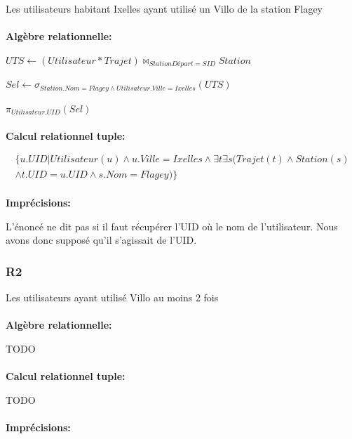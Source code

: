 \documentclass[a4paper, 12pt]{report}
\begin{document}
Les utilisateurs habitant Ixelles ayant utilisé un Villo de la station Flagey
\paragraph{}
\textbf{Algèbre relationnelle:}

$UTS\leftarrow (Utilisateur * Trajet)\bowtie_{StationDépart=SID} Station$

$Sel\leftarrow \sigma_{Station.Nom=Flagey\wedge Utilisateur.Ville=Ixelles}(UTS)$

$\pi_{Utilisateur.UID}(Sel)$
\paragraph{}
\textbf{Calcul relationnel tuple:}

\begin{multline*}
\{  u.UID | Utilisateur(u)\wedge u.Ville=Ixelles \wedge \exists t \exists s ( Trajet(t)\wedge Station(s) \\\wedge t.UID=u.UID \wedge s.Nom=Flagey)   \} 
\end{multline*}

\paragraph{}
\textbf{Imprécisions:}

L'énoncé ne dit pas si il faut récupérer l'UID où le nom de l'utilisateur. Nous avons donc supposé qu'il s'agissait de l'UID.

\subsubsection*{R2}

Les utilisateurs ayant utilisé Villo au moins 2 fois
\paragraph{}
\textbf{Algèbre relationnelle:}

TODO %

\paragraph{}
\textbf{Calcul relationnel tuple:}

TODO %

\paragraph{}
\textbf{Imprécisions:}
\end{document}
